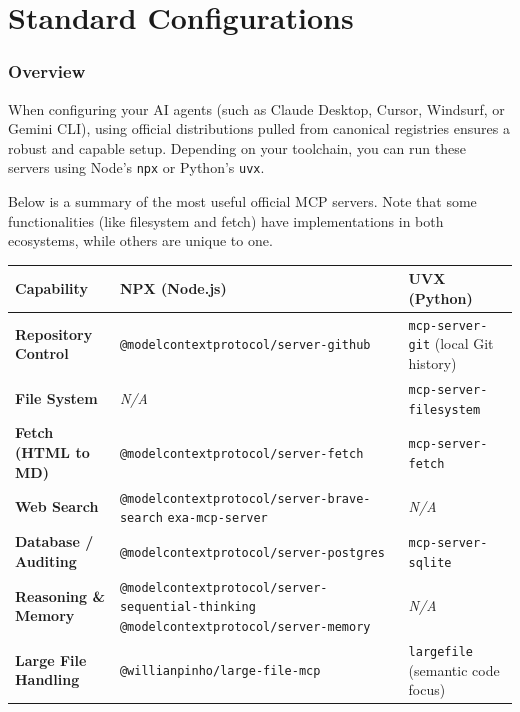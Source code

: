 \newpage
\part{Standard Configurations}

\section{Overview}

When configuring your AI agents (such as Claude Desktop, Cursor, Windsurf, or Gemini CLI), using official distributions pulled from canonical registries ensures a robust and capable setup. Depending on your toolchain, you can run these servers using Node's \lstinline[style=inline]|npx| or Python's \lstinline[style=inline]|uvx|.

Below is a summary of the most useful official MCP servers. Note that some functionalities (like filesystem and fetch) have implementations in both ecosystems, while others are unique to one.

\begin{paratable}
\footnotesize
\begin{tabularx}{\linewidth}{|>{\raggedright\arraybackslash}p{}|>{\raggedright\arraybackslash}X|>{\raggedright\arraybackslash}X|}
\hline
\textbf{Capability} & \textbf{NPX (Node.js)} & \textbf{UVX (Python)} \\
\hline
\textbf{Repository Control} &
\lstinline[style=inline]|@modelcontextprotocol/server-github| &
\lstinline[style=inline]|mcp-server-git| (local Git history) \\
\hline
\textbf{File System} &
\textit{N/A} &
\lstinline[style=inline]|mcp-server-filesystem| \\
\hline
\textbf{Fetch (HTML to MD)} &
\lstinline[style=inline]|@modelcontextprotocol/server-fetch| &
\lstinline[style=inline]|mcp-server-fetch| \\
\hline
\textbf{Web Search} &
\lstinline[style=inline]|@modelcontextprotocol/server-brave-search|\newline
\lstinline[style=inline]|exa-mcp-server| &
\textit{N/A} \\
\hline
\textbf{Database / Auditing} &
\lstinline[style=inline]|@modelcontextprotocol/server-postgres| &
\lstinline[style=inline]|mcp-server-sqlite| \\
\hline
\textbf{Reasoning \& Memory} &
\lstinline[style=inline]|@modelcontextprotocol/server-sequential-thinking|\newline
\lstinline[style=inline]|@modelcontextprotocol/server-memory| &
\textit{N/A} \\
\hline
\textbf{Large File Handling} &
\lstinline[style=inline]|@willianpinho/large-file-mcp| &
\lstinline[style=inline]|largefile| (semantic code focus) \\
\hline
\end{tabularx}
\end{paratable}
